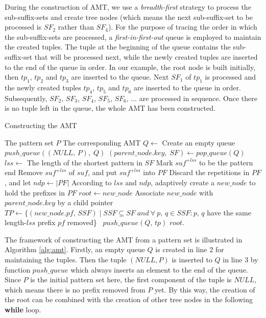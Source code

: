 During the construction of AMT, we use a \emph{breadth-first} strategy
to process the sub-suffix-sets and create tree nodes (which means the
next sub-suffix-set to be processed is $SF_2$ rather than $SF_4$). For
the purpose of tracing the order in which the sub-suffix-sets are
processed, a \emph{first-in-first-out} queue is employed to maintain
the created tuples. The tuple at the beginning of the queue contains
the sub-suffix-set that will be processed next, while the newly
created tuples are inserted to the end of the queue in order. In our
example, the root node is built initially, then $tp_1$, $tp_2$ and
$tp_3$ are inserted to the queue. Next $SF_1$ of $tp_1$ is processed
and the newly created tuples $tp_4$, $tp_5$ and $tp_6$ are inserted to
the queue in order. Subsequently, $SF_2$, $SF_3$, $SF_4$, $SF_5$,
$SF_6$, $\dots$ are processed in sequence. Once there is no tuple left
in the queue, the whole AMT has been constructed.

\begin{algorithm}
  \caption{Constructing the AMT}\scriptsize
  \label{alg:amt}
  \begin{algorithmic}[1]
    \REQUIRE The pattern set $P$
    \ENSURE The corresponding AMT
    \STATE
    \STATE $Q \leftarrow$ Create an empty queue
    \STATE $push\_queue((NULL,\,P),\; Q)$
    \STATE
    \STATE $(parent\_node.key,\; SF) \leftarrow pop\_queue(Q)$
    \STATE $lss \leftarrow$ The length of the shortest pattern in $SF$
    \STATE Mark $suf^{+lss}$ to be the pattern end
    \ENDIF
    \STATE Remove $suf^{+lss}$ of $suf$, and put $suf^{+lss}$ into $PF$
    \ENDFOR
    \STATE Discard the repetitions in $PF$, and let $ndp \leftarrow |PF|$
    \STATE According to $lss$ and $ndp$, adaptively create a
    $new\_node$ to hold the prefixes in
    $PF$
    \STATE $root \leftarrow new\_node$
    \ELSE
    \STATE Associate $new\_node$
    with $parent\_node.key$ by a child pointer
    \ENDIF
    \STATE $TP \leftarrow \{(new\_node.pf,\, SSF) \mid SSF \subseteq SF\; and
    \ \forall \ p,\,q \in SSF: p,\,q$ have the same length-$lss$ prefix
    $pf$ removed\}\
    \STATE $push\_queue(Q,\,tp)$
    \ENDFOR
    \ENDWHILE
    \STATE
    \RETURN $root$.
  \end{algorithmic}
\end{algorithm}

The framework of constructing the AMT from a pattern set is
illustrated in Algorithm \ref{alg:amt}. Firstly, an empty queue $Q$ is
created in line 2 for maintaining the tuples. Then the tuple
$(NULL, P)$ is inserted to $Q$ in line 3 by function $push\_queue$
which always inserts an element to the end of the queue. Since $P$ is
the initial pattern set here, the first component of the tuple is
$NULL$, which means there is no prefix removed from $P$ yet. By this
way, the creation of the root can be combined with the creation of
other tree nodes in the following \textbf{while} loop.

